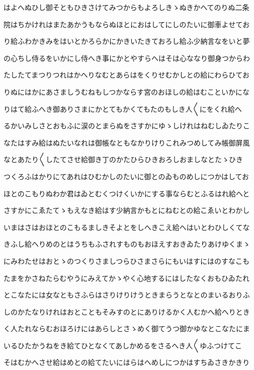 \documentclass[a4paper,11pt,landscape]{ltjtarticle}
\begin{document}
はよへぬひし御そともひきさけてみつからもよろしきゝぬきかへてのりぬ二条
\par\medskip
院はちかけれはまたあかうもならぬほとにおはしてにしのたいに御車よせてお
\par\medskip
り給ふわかきみをはいとかろらかにかきいたきておろし給ふ少納言なをいと夢
\par\medskip
の心ちし侍るをいかにし侍へき事にかとやすらへはそは心ななり御身つからわ
\par\medskip
たしたてまつりつれはかへりなむとあらはをくりせむかしとの給にわらひてお
\par\medskip
りぬにはかにあさましうむねもしつかならす宮のおほしの給はむこといかにな
\par\medskip
りはて給ふへき御ありさまにかとてもかくてもたのもしき人〱にをくれ給へ
\par\medskip
るかいみしさとおもふに涙のとまらぬをさすかにゆゝしけれはねむしゐたりこ
\par\medskip
なたはすみ給はぬたいなれは御帳なともなかりけりこれみつめしてみ帳御屏風
\par\medskip
なとあたり〱したてさせ給御き丁のかたひらひきおろしおましなとたゝひき
\par\medskip
つくろふはかりにてあれはひむかしのたいに御とのゐものめしにつかはしてお
\par\medskip
ほとのこもりぬわか君はゐとむくつけくいかにする事ならむとふるはれ給へと
\par\medskip
さすかにこゑたてゝもえなき給はす少納言かもとにねむとの給こゑいとわかし
\par\medskip
いまはさはおほとのこもるましきそよとをしへきこえ給へはいとわひしくてな
\par\medskip
きふし給へりめのとはうちもふされすものもおほえすおきゐたりあけゆくまゝ
\par\medskip
にみわたせはおとゝのつくりさましつらひさまさらにもいはすにはのすなこも
\par\medskip
たまをかさねたらむやうにみえてかゝやく心地するにはしたなくおもひゐたれ
\par\medskip
とこなたには女なともさふらはさりけりけうときまらうとなとのまいるおりふ
\par\medskip
しのかたなりけれはおとこともそみすのとにありけるかく人むかへ給へりとき
\par\medskip
く人たれならむおほろけにはあらしとさゝめく御てうつ御かゆなとこなたにま
\par\medskip
いるひたかうねをき給てひとなくてあしかめるをさるへき人〱ゆふつけてこ
\par\medskip
そはむかへさせ給はめとの給てたいにはらはへめしにつかはすちゐさきかきり
\end{document}
